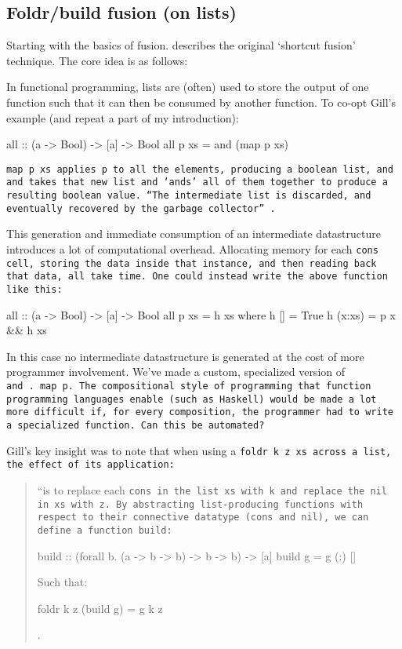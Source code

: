 \subsection{Foldr/build fusion (on lists)}\label{sec:foldr/build}
Starting with the basics of fusion.
\cite{Gill1993} describes the original `shortcut fusion' technique.
The core idea is as follows:

In functional programming, lists are (often) used to store the output of one function such that it can then be consumed by another function. To co-opt Gill's example (and repeat a part of my introduction):
\begin{code}
all :: (a -> Bool) -> [a] -> Bool
all p xs = and (map p xs)
\end{code}

\tt{map p xs} applies \tt{p} to all the elements, producing a boolean list, and \tt{and} takes that new list and `ands' all of them together to produce a resulting boolean value. ``The intermediate list is discarded, and eventually recovered by the garbage collector'' \citep{Gill1993}.

This generation and immediate consumption of an intermediate datastructure introduces a lot of computational overhead. Allocating memory for each \tt{cons} cell, storing the data inside that instance, and then reading back that data, all take time. One could instead write the above function like this:
\begin{code}
all :: (a -> Bool) -> [a] -> Bool
all p xs = h xs
  where h []     = True
        h (x:xs) = p x && h xs
\end{code}
In this case no intermediate datastructure is generated at the cost of more programmer involvement.
We've made a custom, specialized version of \tt{and~.~map~p}.
The compositional style of programming that function programming languages enable (such as Haskell) would be made a lot more difficult if, for every composition, the programmer had to write a specialized function.
Can this be automated?

Gill's key insight was to note that when using a \tt{foldr k z xs} across a list, the effect of its application: 

\begin{quotation}
    ``is to replace each \tt{cons} in the list \tt{xs} with k and replace the \tt{nil} in \tt{xs} with \tt{z}. By abstracting list-producing functions with respect to their connective datatype (\tt{cons} and \tt{nil}), we can define a function \tt{build}:
\begin{code}
build :: (forall b. (a -> b -> b) -> b -> b) -> [a] 
build g = g (:) []
\end{code}
Such that:
\begin{code}
foldr k z (build g) = g k z
\end{code}
\cite{Gill1993}.
\end{quotation}

